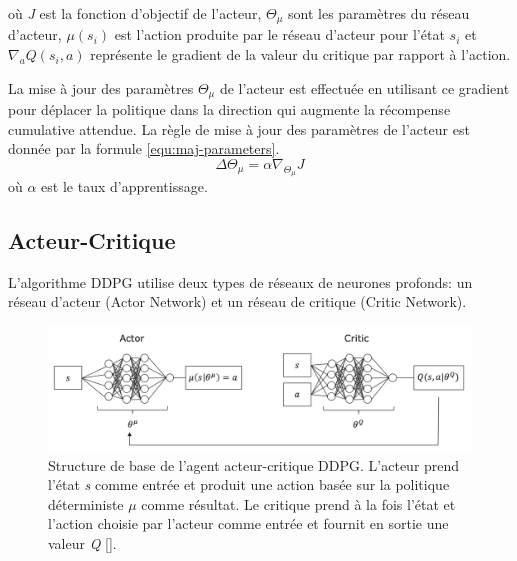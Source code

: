 où \textit{J} est la fonction d'objectif de l'acteur, $\Theta_\mu$ sont les paramètres du réseau d'acteur, $\mu(s_i)$ est l'action produite par le réseau d'acteur pour l'état $s_i$ et $\nabla_a Q(s_i, a)$ représente le gradient de la valeur du critique par rapport à l'action.


La mise à jour des paramètres $\Theta_\mu$ de l'acteur est effectuée en utilisant ce gradient pour déplacer la politique dans la direction qui augmente la récompense cumulative attendue. La règle de mise à jour des paramètres de l'acteur est donnée par la formule \ref{equ:maj-parameters}.
\begin{equation}
    \Delta \Theta_\mu = \alpha \nabla_{\Theta_\mu}J
    \label{equ:maj-parameters}
\end{equation}
où $\alpha$ est le taux d'apprentissage.

\newcommand\mycommfont[1]{\footnotesize\ttfamily\textcolor{blue}{#1}}

\subsection{Acteur-Critique}
L'algorithme DDPG utilise deux types de réseaux de neurones profonds: un réseau d'acteur (Actor Network) et un réseau de critique (Critic Network).

\begin{figure}[hbt!]
  \centering
  \includegraphics[width=15cm]{images_pfe/ddpg-actor-critic.png}
  \caption{Structure de base de l'agent acteur-critique DDPG. L'acteur prend l'état \textit{s} comme entrée et produit une action basée sur la politique déterministe $\mu$ comme résultat. Le critique prend à la fois l'état et l'action choisie par l'acteur comme entrée et fournit en sortie une valeur \textit{Q} [\cite{Liessner2018DeepRL}].}
  \label{fig:ddpg-actor-critic}
\end{figure}
\FloatBarrier
\medskip

